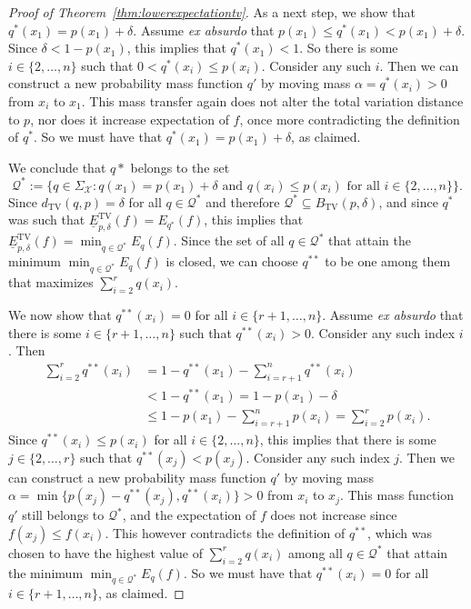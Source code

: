 \documentclass{article}
\begin{document}
\begin{proof}[Proof of Theorem~\ref{thm:lowerexpectationtv}]
As a next step, we show that $q^*(x_1)=p(x_1)+\delta$. Assume \emph{ex absurdo} that $p(x_1)\leq q^*(x_1)<p(x_1)+\delta$. Since $\delta<1-p(x_1)$, this implies that $q^*(x_1)<1$. So there is some $i\in\{2,\ldots,n\}$ such that $0<q^*(x_i)\leq p(x_i)$. Consider any such $i$. Then we can construct a new probability mass function $q'$ by moving mass $\alpha=q^*(x_i)>0$ from $x_i$ to $x_1$. This mass transfer again does not alter the total variation distance to $p$, nor does it increase expectation of $f$, once more contradicting the definition of $q^*$. So we must have that $q^*(x_1)=p(x_1)+\delta$, as claimed.

We conclude that $q*$ belongs to the set
\begin{equation*}
\mathcal{Q}^*:=\{q\in\Sigma_\mathcal{X}: q(x_1)=p(x_1)+\delta\text{ and }q(x_i)\leq p(x_i)\text{ for all }i\in\{2,\ldots,n\}\}.
\end{equation*}
Since $d_\mathrm{TV}(q,p)=\delta$ for all $q\in\mathcal{Q}^*$ and therefore $\mathcal{Q}^*\subseteq B_\mathrm{TV}(p,\delta)$, and since $q^*$ was such that $\underline{E}^\mathrm{TV}_{p,\delta}(f)=E_{q^*}(f)$, this implies that $\underline{E}^\mathrm{TV}_{p,\delta}(f)=\min_{q\in\mathcal{Q}^*} E_q(f)$. Since the set of all $q\in\mathcal{Q}^*$ that attain the minimum $\min_{q\in\mathcal{Q}^*} E_q(f)$ is closed, we can choose $q^{**}$ to be one among them that maximizes $\sum_{i=2}^r q(x_i)$.

We now show that $q^{**}(x_i)=0$ for all $i\in\{r+1,\ldots,n\}$. Assume \emph{ex absurdo} that there is some $i\in\{r+1,\ldots,n\}$ such that $q^{**}(x_i)>0$. Consider any such index $i$. Then
\begin{align*}
\sum_{i=2}^r q^{**}(x_i)
&=1-q^{**}(x_1)-\sum_{i=r+1}^n q^{**}(x_i)\\
&<1-q^{**}(x_1)=1-p(x_1)-\delta\\
&\leq1-p(x_1)-\sum_{i=r+1}^n p(x_i)=\sum_{i=2}^r p(x_i).
\end{align*}
Since $q^{**}(x_i)\leq p(x_i)$ for all $i\in\{2,\ldots,n\}$, this implies that there is some $j\in\{2,\ldots,r\}$ such that $q^{**}(x_j)<p(x_j)$. Consider any such index $j$. Then we can construct a new probability mass function $q'$ by moving mass $\alpha=\min\{p(x_j)-q^{**}(x_j),q^{**}(x_i)\}>0$ from $x_i$ to $x_j$. This mass function $q'$ still belongs to $\mathcal{Q}^*$, and the expectation of $f$ does not increase since $f(x_j)\leq f(x_i)$. This however contradicts the definition of $q^{**}$, which was chosen to have the highest value of $\sum_{i=2}^r q(x_i)$ among all $q\in\mathcal{Q}^*$ that attain the minimum $\min_{q\in\mathcal{Q}^*} E_q(f)$. So we must have that $q^{**}(x_i)=0$ for all $i\in\{r+1,\ldots,n\}$, as claimed.


\end{proof}
\end{document}
